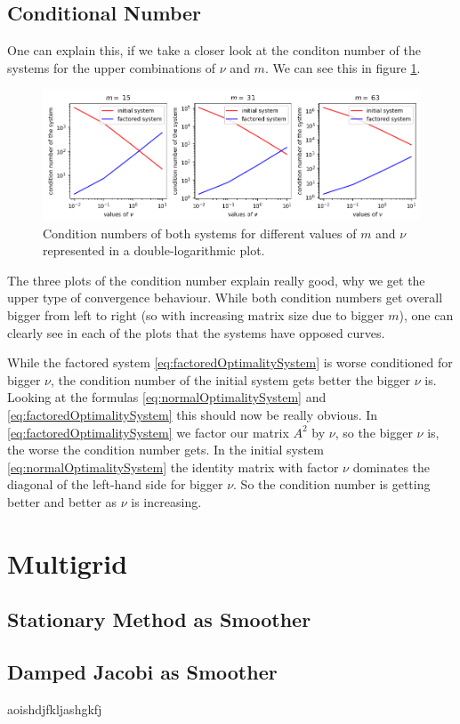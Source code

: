 \documentclass{amsart}
\theoremstyle{definition}
\theoremstyle{remark}
\numberwithin{equation}{section}
\begin{document}
\subsection{Conditional Number}
One can explain this, if we take a closer look at the conditon number of the systems for the upper combinations of $\nu$ and $m$. We can see this in 
figure \ref{fig:CG-conditionNumber}.
\begin{figure}[h!]
\centering
\includegraphics[scale=0.65]{./imgs/CG_conditionNumber}
\caption{Condition numbers of both systems for different values of $m$ and $\nu$ represented in a double-logarithmic plot.}
\label{fig:CG-conditionNumber}
\end{figure}
The three plots of the condition number explain really good, why we get the upper type of convergence behaviour. While both condition numbers get overall
bigger from left to right (so with increasing matrix size due to bigger $m$), one can clearly see in each of the plots that the systems have opposed 
curves.

While the factored system \eqref{eq:factoredOptimalitySystem} is worse conditioned for bigger $\nu$, the condition number of the initial system 
gets better the bigger $\nu$ is. Looking at the formulas \eqref{eq:normalOptimalitySystem} and \eqref{eq:factoredOptimalitySystem} this should now be 
really obvious.
In \eqref{eq:factoredOptimalitySystem} we factor our matrix $A^2$ by $\nu$, so the bigger $\nu$ is, the worse the condition number gets. In the initial 
system \eqref{eq:normalOptimalitySystem} the identity matrix with factor $\nu$ dominates the diagonal of the left-hand side for bigger $\nu$. So the 
condition number is getting better and better as $\nu$ is increasing.






\section{Multigrid}


\subsection{Stationary Method as Smoother}


\subsection{Damped Jacobi as Smoother}
aoishdjfkljashgkfj
\end{document}
